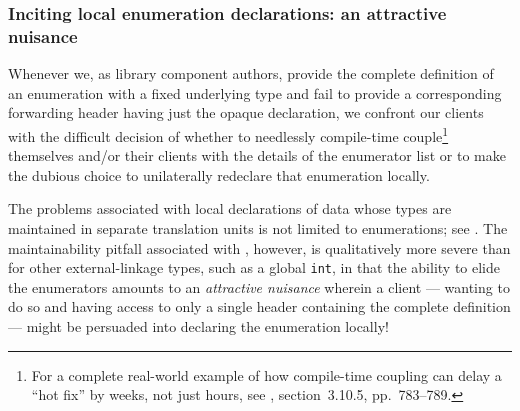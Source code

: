 
\subsubsection[Inciting local enumeration declarations: an attractive nuisance]{Inciting local enumeration declarations: an attractive nuisance}\label{inciting-local-enumeration-declarations-an-attractive-nuisance}

Whenever we, as library component authors, provide the complete
definition of an enumeration with a fixed underlying type and fail to provide a
corresponding forwarding header having just the opaque declaration, we confront our
clients with the difficult decision of whether to needlessly
compile-time couple\footnote{For a complete real-world example of how compile-time coupling can delay a ``hot fix'' by weeks, not just hours, see \cite{lakos20}, section~3.10.5, pp.~783--789.} themselves and/or their clients with the details of
the enumerator list or to make the dubious choice to unilaterally
redeclare that enumeration locally.

The problems associated with local declarations of data whose types are
maintained in separate translation units is not limited to enumerations;
see . The maintainability pitfall associated with
, however, is qualitatively more severe than
for other external-linkage types, such as a global \lstinline!int!, in that
the ability to elide the enumerators amounts to an \emph{attractive
nuisance} wherein a client --- wanting to do so and having access to
only a single header containing the complete definition --- might be persuaded into declaring the enumeration locally!

